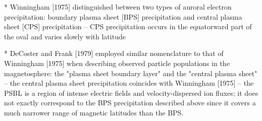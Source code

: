 
* Winningham [1975] distinguished between two types of auroral electron
precipitation: boundary plasma sheet [BPS] precipitation and central
plasma sheet [CPS] precipitation
 -- CPS precipitation occurs in the equatorward part of the oval and
 varies slowly with latitude

* DeCoster and Frank [1979] employed similar nomenclature to that of
Winningham [1975] when describing observed particle populations in 
the magnetosphere: the "plasma sheet boundary layer" and
the "central plasma sheet"
 -- the central plasma sheet precipitation coincides with Winningham
 [1975]
 -- the PSBL is a region of intense electric fields and
 velocity-dispersed ion fluxes; it does not exactly correspond to the BPS 
 precipitation described above since it covers a much narrower range of 
 magnetic latitudes than the BPS.
